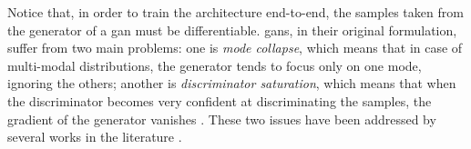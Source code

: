 Notice that, in order to train the architecture end-to-end, the samples taken from the generator of a \gls{gan} must be differentiable. \glspl{gan}, in their original formulation, suffer from two main problems: one is \emph{mode collapse}, which means that in case of multi-modal distributions, the generator tends to focus only on one mode, ignoring the others; another is \emph{discriminator saturation}, which means that when the discriminator becomes very confident at discriminating the samples, the gradient of the generator vanishes \citep{goodfellow2014gan}. These two issues have been addressed by several works in the literature \citep{salimans2016improvedgans}.
